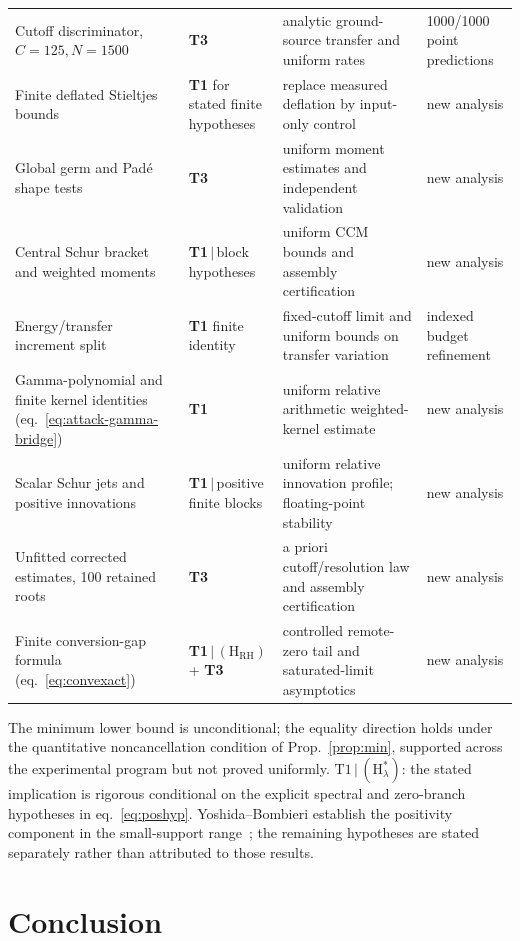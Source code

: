 \documentclass[11pt,a4paper]{article}
\begin{document}
{\begin{longtable}{@{}p{4.6cm} p{2.7cm} p{4.6cm} p{2.4cm}@{}}
Cutoff discriminator, $C=125,N=1500$ & \textbf{T3} & analytic ground-source transfer and uniform rates & 1000/1000 point predictions \\
Finite deflated Stieltjes bounds & \textbf{T1} for stated finite hypotheses & replace measured deflation by input-only control & new analysis \\
Global germ and Pad\'e shape tests & \textbf{T3} & uniform moment estimates and independent validation & new analysis \\
Central Schur bracket and weighted moments & \textbf{T1}$\,|\,$block hypotheses & uniform CCM bounds and assembly certification & new analysis \\
Energy/transfer increment split & \textbf{T1} finite identity & fixed-cutoff limit and uniform bounds on transfer variation & indexed budget refinement \\
Gamma-polynomial and finite kernel identities (eq.~\eqref{eq:attack-gamma-bridge}) & \textbf{T1} & uniform relative arithmetic weighted-kernel estimate & new analysis \\
Scalar Schur jets and positive innovations & \textbf{T1}$\,|\,$positive finite blocks & uniform relative innovation profile; floating-point stability & new analysis \\
Unfitted corrected estimates, 100 retained roots & \textbf{T3} & a priori cutoff/resolution law and assembly certification & new analysis \\
Finite conversion-gap formula (eq.~\eqref{eq:convexact}) & \textbf{T1}$\,|\,(\mathrm{H}_{\mathrm{RH}})$ + \textbf{T3} & controlled remote-zero tail and saturated-limit asymptotics & new analysis \\
\end{longtable}}
\medskip

{\footnotesize The minimum lower bound is unconditional; the equality direction
holds under the quantitative noncancellation condition of
Prop.~\ref{prop:min}, supported across the experimental program but not proved
uniformly.
$\mathrm{T1}\,|\,(\mathrm{H}_\lambda^\ast)$: the stated implication is
rigorous conditional on the explicit spectral and zero-branch hypotheses in
eq.~\eqref{eq:poshyp}. Yoshida--Bombieri establish the positivity component in
the small-support range~\cite{Yoshida1992,Bombieri2000}; the remaining
hypotheses are stated separately rather than attributed to those results.}

\section{Conclusion}\label{sec:conclusion}
\end{document}
